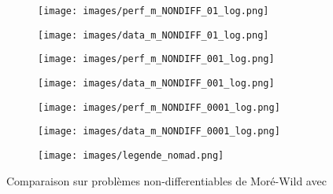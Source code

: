 			\begin{figure}[!htb] %
				\centering
				\begin{subfigure}{0.43\textwidth}
					\texttt{[image: images/perf\_m\_NONDIFF\_01\_log.png]}
				\end{subfigure}%
				\begin{subfigure}{0.43\textwidth}
					\texttt{[image: images/data\_m\_NONDIFF\_01\_log.png]}
				\end{subfigure}
				\smallskip
				\begin{subfigure}{0.43\textwidth}
					\texttt{[image: images/perf\_m\_NONDIFF\_001\_log.png]}
				\end{subfigure}%
				\begin{subfigure}{0.43\textwidth}
					\texttt{[image: images/data\_m\_NONDIFF\_001\_log.png]}
				\end{subfigure}
				\smallskip
				\begin{subfigure}{0.43\textwidth}
					\texttt{[image: images/perf\_m\_NONDIFF\_0001\_log.png]}
				\end{subfigure}%
				\begin{subfigure}{0.43\textwidth}
					\texttt{[image: images/data\_m\_NONDIFF\_0001\_log.png]}
				\end{subfigure}
				\smallskip
				\begin{subfigure}{0.95\textwidth}
					\texttt{[image: images/legende\_nomad.png]}
				\end{subfigure}
				\caption{Comparaison sur problèmes non-differentiables de Moré-Wild avec \CS} \label{fig:1}
			\end{figure}
			\clearpage
